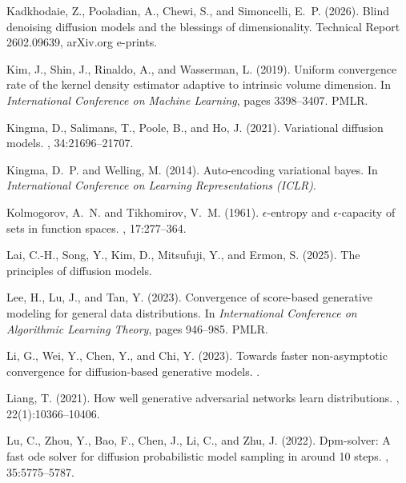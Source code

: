 \documentclass[12pts]{article}
\begin{document}
\begin{thebibliography}{}
Kadkhodaie, Z., Pooladian, A., Chewi, S., and Simoncelli, E.~P. (2026).
\newblock Blind denoising diffusion models and the blessings of dimensionality.
\newblock Technical Report 2602.09639, arXiv.org e-prints.

Kim, J., Shin, J., Rinaldo, A., and Wasserman, L. (2019).
\newblock Uniform convergence rate of the kernel density estimator adaptive to intrinsic volume dimension.
\newblock In {\em International Conference on Machine Learning}, pages 3398--3407. PMLR.

Kingma, D., Salimans, T., Poole, B., and Ho, J. (2021).
\newblock Variational diffusion models.
, 34:21696--21707.

Kingma, D.~P. and Welling, M. (2014).
\newblock Auto-encoding variational bayes.
\newblock In {\em International Conference on Learning Representations (ICLR)}.

Kolmogorov, A.~N. and Tikhomirov, V.~M. (1961).
\newblock $\epsilon$-entropy and $\epsilon$-capacity of sets in function spaces.
, 17:277--364.

Lai, C.-H., Song, Y., Kim, D., Mitsufuji, Y., and Ermon, S. (2025).
\newblock The principles of diffusion models.

Lee, H., Lu, J., and Tan, Y. (2023).
\newblock Convergence of score-based generative modeling for general data distributions.
\newblock In {\em International Conference on Algorithmic Learning Theory}, pages 946--985. PMLR.

Li, G., Wei, Y., Chen, Y., and Chi, Y. (2023).
\newblock Towards faster non-asymptotic convergence for diffusion-based generative models.
.

Liang, T. (2021).
\newblock How well generative adversarial networks learn distributions.
, 22(1):10366--10406.

Lu, C., Zhou, Y., Bao, F., Chen, J., Li, C., and Zhu, J. (2022).
\newblock Dpm-solver: A fast ode solver for diffusion probabilistic model sampling in around 10 steps.
, 35:5775--5787.


\end{thebibliography}
\end{document}
